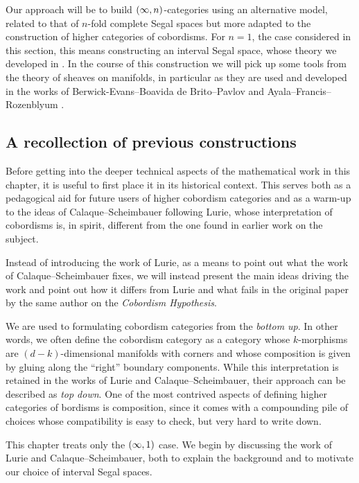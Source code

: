 Our approach will be to build $(\operatorname{\infty},n)$-categories using an alternative model, related to that of $n$-fold complete Segal spaces but more adapted to the construction of higher categories of cobordisms. For $n=1$, the case considered in this section, this means constructing an interval Segal space, whose theory we developed in . In the course of this construction we will pick up some tools from the theory of sheaves on manifolds, in particular as they are used and developed in the works of Berwick-Evans--Boavida de Brito--Pavlov \cite{BBEP24} and Ayala--Francis--Rozenblyum \cite{AFR1}. 

\subsection{A recollection of previous constructions}

Before getting into the deeper technical aspects of the mathematical work in this chapter, it is useful to first place it in its historical context. This serves both as a pedagogical aid for future users of higher cobordism categories and as a warm-up to the ideas of Calaque--Scheimbauer following Lurie, whose interpretation of cobordisms is, in spirit, different from the one found in earlier work on the subject. 

Instead of introducing the work of Lurie, as a means to point out what the work of Calaque--Scheimbauer fixes, we will instead present the main ideas driving the work and point out how it differs from Lurie and what fails in the original paper by the same author on the \emph{Cobordism Hypothesis}.

We are used to formulating cobordism categories from the \emph{bottom up}. In other words, we often define the cobordism category as a category whose $k$-morphisms are $(d-k)$-dimensional manifolds with corners and whose composition is given by gluing along the ``right'' boundary components. While this interpretation is retained in the works of Lurie and Calaque--Scheimbauer, their approach can be described as \emph{top down}. One of the most contrived aspects of defining higher categories of bordisms is composition, since it comes with a compounding pile of choices whose compatibility is easy to check, but very hard to write down.

This chapter treats only the $(\operatorname{\infty},1)$ case. We begin by discussing the work of
Lurie and Calaque--Scheimbauer, both to explain the background and to motivate
our choice of interval Segal spaces. 

